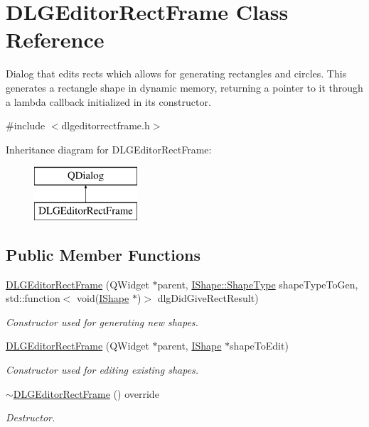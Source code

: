 \hypertarget{class_d_l_g_editor_rect_frame}{}\section{D\+L\+G\+Editor\+Rect\+Frame Class Reference}
\label{class_d_l_g_editor_rect_frame}


Dialog that edits rects which allows for generating rectangles and circles. This generates a rectangle shape in dynamic memory, returning a pointer to it through a lambda callback initialized in its constructor.  




{\ttfamily \#include $<$dlgeditorrectframe.\+h$>$}

Inheritance diagram for D\+L\+G\+Editor\+Rect\+Frame\+:\begin{figure}[H]
\begin{center}
\leavevmode
\includegraphics[height=2.000000cm]{class_d_l_g_editor_rect_frame}
\end{center}
\end{figure}
\subsection*{Public Member Functions}
\begin{DoxyCompactItemize}
\item 
\mbox{\hyperlink{class_d_l_g_editor_rect_frame_a9a800ac2abdc6abb515c12a911ff5477}{D\+L\+G\+Editor\+Rect\+Frame}} (Q\+Widget $\ast$parent, \mbox{\hyperlink{class_i_shape_a8f50993477b5ddb44c0547ef3d547cdc}{I\+Shape\+::\+Shape\+Type}} shape\+Type\+To\+Gen, std\+::function$<$ void(\mbox{\hyperlink{class_i_shape}{I\+Shape}} $\ast$)$>$ dlg\+Did\+Give\+Rect\+Result)
\begin{DoxyCompactList}\small\item\em Constructor used for generating new shapes. \end{DoxyCompactList}\item 
\mbox{\hyperlink{class_d_l_g_editor_rect_frame_aed3ab2ad2cd095c140b91357b93a0515}{D\+L\+G\+Editor\+Rect\+Frame}} (Q\+Widget $\ast$parent, \mbox{\hyperlink{class_i_shape}{I\+Shape}} $\ast$shape\+To\+Edit)
\begin{DoxyCompactList}\small\item\em Constructor used for editing existing shapes. \end{DoxyCompactList}\item 
\mbox{\hyperlink{class_d_l_g_editor_rect_frame_a1d27bddcdac8f640544fd7768cfb0e02}{$\sim$\+D\+L\+G\+Editor\+Rect\+Frame}} () override
\begin{DoxyCompactList}\small\item\em Destructor. \end{DoxyCompactList}\end{DoxyCompactItemize}



